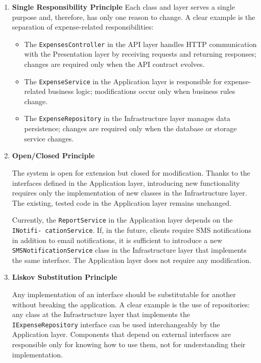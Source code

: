 \begin{enumerate} [leftmargin=0.75cm]
    
    \item \textbf{Single Responsibility Principle}
    Each class and layer serves a single purpose and, therefore, has only one reason to change. A clear example is the separation of expense-related responsibilities:

    \begin{itemize} [leftmargin=0.75cm, label=\textbullet]
        
        \item The \texttt{ExpensesController} in the API layer handles HTTP communication with the Presentation layer by receiving requests and returning responses; changes are required only when the API contract evolves.

        \item The \texttt{ExpenseService} in the Application layer is responsible for expense-related business logic; modifications occur only when business rules change.

        \item The \texttt{ExpenseRepository} in the Infrastructure layer manages data persistence; changes are required only when the database or storage service changes.

    \end{itemize}

    \item \textbf{Open/Closed Principle}

    The system is open for extension but closed for modification. Thanks to the interfaces defined in the Application layer, introducing new functionality requires only the implementation of new classes in the Infrastructure layer. The existing, tested code in the Application layer remains unchanged.

    Currently, the \texttt{ReportService} in the Application layer depends on the \texttt{INotifi- cationService}. If, in the future, clients require SMS notifications in addition to email notifications, it is sufficient to introduce a new \texttt{SMSNotificationService} class in the Infrastructure layer that implements the same interface. The Application layer does not require any modification.

    \item \textbf{Liskov Substitution Principle}

    Any implementation of an interface should be substitutable for another without breaking the application. A clear example is the use of repositories: any class at the Infrastructure layer that implements the \texttt{IExpenseRepository} interface can be used interchangeably by the Application layer. Components that depend on external interfaces are responsible only for knowing how to use them, not for understanding their implementation.


\end{enumerate}
